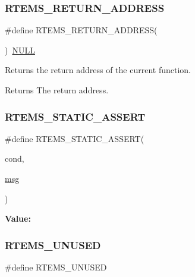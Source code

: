 \subsubsection{\texorpdfstring{RTEMS\_RETURN\_ADDRESS}{RTEMS\_RETURN\_ADDRESS}}
{\footnotesize\ttfamily \#define R\+T\+E\+M\+S\+\_\+\+R\+E\+T\+U\+R\+N\+\_\+\+A\+D\+D\+R\+E\+SS(\begin{DoxyParamCaption}{ }\end{DoxyParamCaption})~\mbox{\hyperlink{bestcomm__api_8h_a872bb74de61c3689ccd5b41873fce42c}{N\+U\+LL}}}



Returns the return address of the current function. 

\begin{DoxyReturn}{Returns}
The return address. 
\end{DoxyReturn}
\mbox{\label{group__RTEMSScoreBaseDefs_ga49314486f3d648eba9c1761acb501dda}} 
\subsubsection{\texorpdfstring{RTEMS\_STATIC\_ASSERT}{RTEMS\_STATIC\_ASSERT}}
{\footnotesize\ttfamily \#define R\+T\+E\+M\+S\+\_\+\+S\+T\+A\+T\+I\+C\+\_\+\+A\+S\+S\+E\+RT(\begin{DoxyParamCaption}\item[{}]{cond,  }\item[{}]{\mbox{\hyperlink{structmsg}{msg}} }\end{DoxyParamCaption})}

{\bfseries Value\+:}
\begin{DoxyCode}{0}

\end{DoxyCode}
\mbox{\label{group__RTEMSScoreBaseDefs_ga6794c0ff237a90e837e19f9bbcae4297}} 
\subsubsection{\texorpdfstring{RTEMS\_UNUSED}{RTEMS\_UNUSED}}
{\footnotesize\ttfamily \#define R\+T\+E\+M\+S\+\_\+\+U\+N\+U\+S\+ED}

